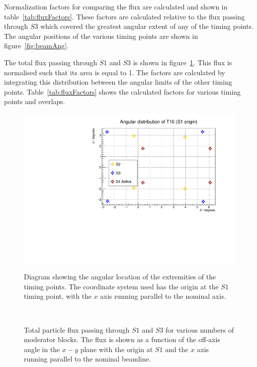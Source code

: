 	Normalization factors for comparing the flux are calculated and shown in table~\ref{tab:fluxFactors}.
	These factors are calculated relative to the flux passing through $S3$ which covered the greatest angular extent of any of the timing points. 
	The angular positions of the various timing points are shown in figure~\ref{fig:beamAng}.
	
	\begin{figure}[h]
		
	\end{figure}
		
	The total flux passing through $S1$ and $S3$ is shown in figure~\ref{fig:s1s3all}.
	This flux is normalised such that its area is equal to 1.
	The factors are calculated by integrating this distribution between the angular limits of the other timing points.
	Table~\ref{tab:fluxFactors} shows the calculated factors for various timing points and overlaps.
	
	\begin{figure}[h]
		\begin{minipage}{0.49\textwidth}
			\centering
			\includegraphics[width=\textwidth]{files/Figures/beamlineAng.pdf}
			\caption{Diagram showing the angular location of the extremities of the timing points. The coordinate system used has the origin at the $S1$ timing 	point, with the $x$ axis running parallel to the nominal axis.}
			\label{fig:beamAng}
		\end{minipage}
		\hspace{0.2cm}
		\begin{minipage}{0.49\textwidth}
			\begin{adjustbox}{max totalsize={\textwidth}{0.5\textheight}, center}
				
			\end{adjustbox}
			\caption{Total particle flux passing through $S1$ and $S3$ for various numbers of moderator blocks. The flux is shown as a function of the off-axis angle in the $x-y$ plane with the origin at $S1$ and the $x$ axis running parallel to the nominal beamline.}
			\label{fig:s1s3all}
		\end{minipage}
		\
	\end{figure}
		
